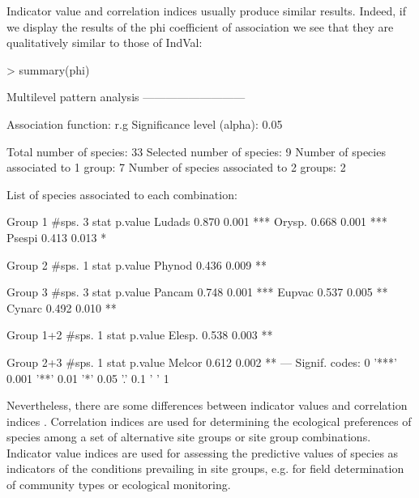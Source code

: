 \documentclass[11pt,a4paper]{article}
\begin{document}
Indicator value and correlation indices usually produce similar results. Indeed, if we display the results of the phi coefficient of association we see that they are qualitatively similar to those of IndVal: 
\begin{Schunk}
\begin{Sinput}
> summary(phi)
\end{Sinput}
\begin{Soutput}
 Multilevel pattern analysis
 ---------------------------

 Association function: r.g
 Significance level (alpha): 0.05

 Total number of species: 33
 Selected number of species: 9 
 Number of species associated to 1 group: 7 
 Number of species associated to 2 groups: 2 

 List of species associated to each combination: 

 Group 1  #sps.  3 
        stat p.value    
Ludads 0.870   0.001 ***
Orysp. 0.668   0.001 ***
Psespi 0.413   0.013 *  

 Group 2  #sps.  1 
        stat p.value   
Phynod 0.436   0.009 **

 Group 3  #sps.  3 
        stat p.value    
Pancam 0.748   0.001 ***
Eupvac 0.537   0.005 ** 
Cynarc 0.492   0.010 ** 

 Group 1+2  #sps.  1 
        stat p.value   
Elesp. 0.538   0.003 **

 Group 2+3  #sps.  1 
        stat p.value   
Melcor 0.612   0.002 **
---
Signif. codes:  0 '***' 0.001 '**' 0.01 '*' 0.05 '.' 0.1 ' ' 1 
\end{Soutput}
\end{Schunk}
Nevertheless, there are some differences between indicator values and correlation indices \citep{DeCaceres2008}\citep{DeCaceres2009}. Correlation indices are used for determining the ecological preferences of species among a set of alternative site groups or site group combinations. Indicator value indices are used for assessing the predictive values of species as indicators of the conditions prevailing in site groups, e.g. for field determination of community types or ecological monitoring.
\end{document}
